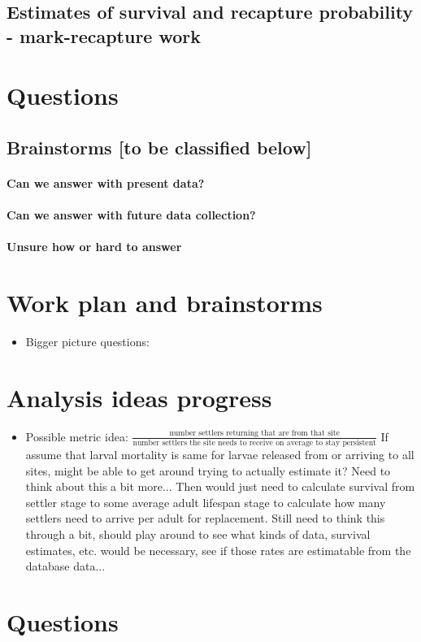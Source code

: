 \documentclass[12pt, oneside]{article}   	%
\begin{document}
\subsection*{Estimates of survival and recapture probability - mark-recapture work}

\section*{Questions}
\subsection*{Brainstorms [to be classified below]}
\paragraph*{Can we answer with present data?}
\paragraph*{Can we answer with future data collection?}
\paragraph*{Unsure how or hard to answer}

\section*{Work plan and brainstorms}
\begin{itemize}
\item Bigger picture questions: 
\end{itemize}

\section*{Analysis ideas progress}
\begin{itemize}
\item Possible metric idea: $\frac{\text{number settlers returning that are from that site}}{\text{number settlers the site needs to receive on average to stay persistent}}$ If assume that larval mortality is same for larvae released from or arriving to all sites, might be able to get around trying to actually estimate it? Need to think about this a bit more... Then would just need to calculate survival from settler stage to some average adult lifespan stage to calculate how many settlers need to arrive per adult for replacement. Still need to think this through a bit, should play around to see what kinds of data, survival estimates, etc. would be necessary, see if those rates are estimatable from the database data...
\end{itemize}

\section*{Questions}



%
%
\end{document}
